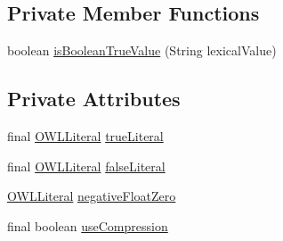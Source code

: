 \subsection*{Private Member Functions}
\begin{DoxyCompactItemize}
\item 
boolean \hyperlink{classuk_1_1ac_1_1manchester_1_1cs_1_1owl_1_1owlapi_1_1_internals_no_cache_ad7e6b8d77719aed9a73635ac2a2e5095}{is\-Boolean\-True\-Value} (String lexical\-Value)
\end{DoxyCompactItemize}
\subsection*{Private Attributes}
\begin{DoxyCompactItemize}
\item 
final \hyperlink{interfaceorg_1_1semanticweb_1_1owlapi_1_1model_1_1_o_w_l_literal}{O\-W\-L\-Literal} \hyperlink{classuk_1_1ac_1_1manchester_1_1cs_1_1owl_1_1owlapi_1_1_internals_no_cache_a4b6cd6f2f3361713ea5f10937b55e363}{true\-Literal}
\item 
final \hyperlink{interfaceorg_1_1semanticweb_1_1owlapi_1_1model_1_1_o_w_l_literal}{O\-W\-L\-Literal} \hyperlink{classuk_1_1ac_1_1manchester_1_1cs_1_1owl_1_1owlapi_1_1_internals_no_cache_a2f93f489910abfb01cd8aa402f17cfc5}{false\-Literal}
\item 
\hyperlink{interfaceorg_1_1semanticweb_1_1owlapi_1_1model_1_1_o_w_l_literal}{O\-W\-L\-Literal} \hyperlink{classuk_1_1ac_1_1manchester_1_1cs_1_1owl_1_1owlapi_1_1_internals_no_cache_a950b8da09966e7eb5e32cc0b5718beea}{negative\-Float\-Zero}
\item 
final boolean \hyperlink{classuk_1_1ac_1_1manchester_1_1cs_1_1owl_1_1owlapi_1_1_internals_no_cache_a1beef4bccf6fba4712e20f92f7726b38}{use\-Compression}
\end{DoxyCompactItemize}
